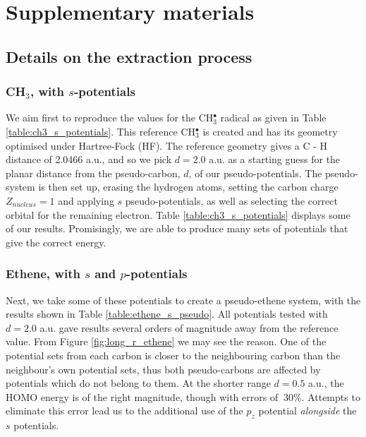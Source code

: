 \documentclass[aip]{revtex4-1}
\begin{document}

\clearpage
\section{Supplementary materials}
\subsection{Details on the extraction process}
\subsubsection{CH\(_{3}\), with \(s\)-potentials}

We aim first to reproduce the values for the CH\(^{\bullet}_{3}\) radical as given in Table \ref{table:ch3_s_potentials}. 
This reference CH\(^{\bullet}_{3}\) is created and has its geometry optimised under Hartree-Fock (HF). The reference geometry gives a C - H distance of 2.0466 a.u., and so we pick \(d = 2.0\) a.u. as a starting guess for the planar distance from the pseudo-carbon, \(d\), of our pseudo-potentials. The pseudo-system is then set up, erasing the hydrogen atoms, setting the carbon charge \(Z_{nucleus} = 1\) and applying \(s\) pseudo-potentials, as well as selecting the correct orbital for the remaining electron. Table \ref{table:ch3_s_potentials} displays some of our results. Promisingly, we are able to produce many sets of potentials that give the correct energy.

\subsubsection{Ethene, with \(s\) and \(p\)-potentials}

Next, we take some of these potentials to create a pseudo-ethene system, with the results shown in Table \ref{table:ethene_s_pseudo}. All potentials tested with \(d = 2.0\) a.u. gave results several orders of magnitude away from the reference value. From Figure \ref{fig:long_r_ethene} we may see the reason. One of the potential sets from each carbon is closer to the neighbouring carbon than the neighbour's own potential sets, thus both pseudo-carbons are affected by potentials which do not belong to them. At the shorter range \(d = 0.5\) a.u., the HOMO energy is of the right magnitude, though with errors of \(~ 30\%\). Attempts to eliminate this error lead us to the additional use of the \(p_{z}\) potential \textit{alongside} the \(s\) potentials.
\end{document}
